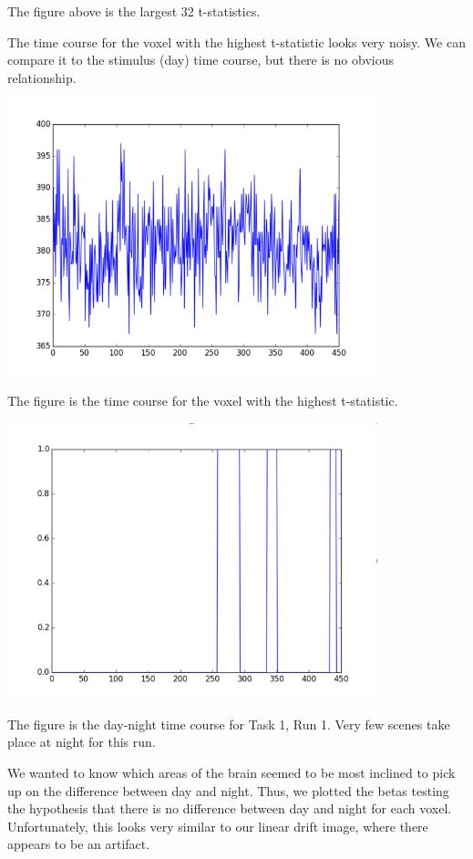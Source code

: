 \documentclass[11pt]{article}
\begin{document}
The figure above is the largest 32 t-statistics.

The time course for the voxel with the highest t-statistic looks very noisy.
We can compare it to the stimulus (day) time course, but there is no obvious
relationship.


\begin{center}
\includegraphics[height=8cm]{4}
\end{center}

The figure is the time course for the voxel with the highest t-statistic.

\begin{center}
\includegraphics[height=8cm]{5}
\end{center}

The figure is the day-night time course for Task 1, Run 1.  Very few scenes
take place at night for this run.

We wanted to know which areas of the brain seemed to be most inclined to pick
up on the difference between day and night.  Thus, we plotted the betas
testing the hypothesis that there is no difference between day and night for
each voxel.  Unfortunately, this looks very similar to our linear drift image,
where there appears to be an artifact.
\end{document}
